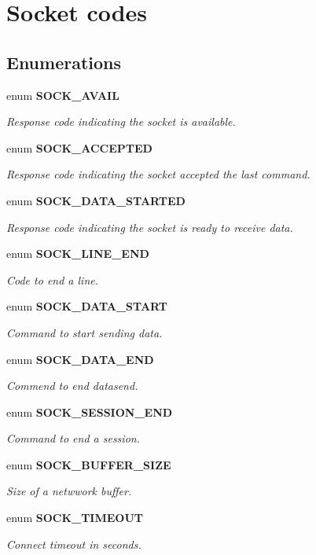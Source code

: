 \section{Socket codes}
\label{group__SOCKET__Codes}
\subsection*{Enumerations}
\begin{DoxyCompactItemize}
\item 
enum {\bf SOCK\_\-AVAIL} 
\begin{DoxyCompactList}\small\item\em Response code indicating the socket is available. \end{DoxyCompactList}\item 
enum {\bf SOCK\_\-ACCEPTED} 
\begin{DoxyCompactList}\small\item\em Response code indicating the socket accepted the last command. \end{DoxyCompactList}\item 
enum {\bf SOCK\_\-DATA\_\-STARTED} 
\begin{DoxyCompactList}\small\item\em Response code indicating the socket is ready to receive data. \end{DoxyCompactList}\item 
enum {\bf SOCK\_\-LINE\_\-END} 
\begin{DoxyCompactList}\small\item\em Code to end a line. \end{DoxyCompactList}\item 
enum {\bf SOCK\_\-DATA\_\-START} 
\begin{DoxyCompactList}\small\item\em Command to start sending data. \end{DoxyCompactList}\item 
enum {\bf SOCK\_\-DATA\_\-END} 
\begin{DoxyCompactList}\small\item\em Commend to end datasend. \end{DoxyCompactList}\item 
enum {\bf SOCK\_\-SESSION\_\-END} 
\begin{DoxyCompactList}\small\item\em Command to end a session. \end{DoxyCompactList}\item 
enum {\bf SOCK\_\-BUFFER\_\-SIZE} 
\begin{DoxyCompactList}\small\item\em Size of a netwwork buffer. \end{DoxyCompactList}\item 
enum {\bf SOCK\_\-TIMEOUT} 
\begin{DoxyCompactList}\small\item\em Connect timeout in seconds. \end{DoxyCompactList}\end{DoxyCompactItemize}


